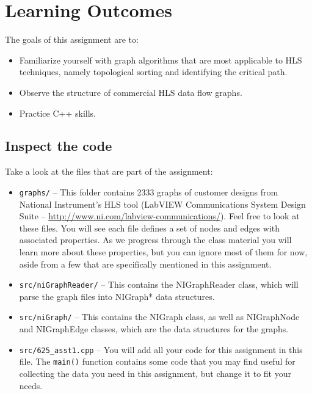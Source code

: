 



\setuppage



\maketitle
\thispagestyle{fancy}

\section{Learning Outcomes}
The goals of this assignment are to:
\begin{itemize}
	\item Familiarize yourself with graph algorithms that are most applicable to HLS techniques, namely topological sorting and identifying the critical path.
	\item Observe the structure of commercial HLS data flow graphs.
	\item Practice C++ skills.
\end{itemize}



\subsection{Inspect the code}
Take a look at the files that are part of the assignment:
\begin{itemize}
	\item {\tt graphs/} -- This folder contains 2333 graphs of customer designs from National Instrument's HLS tool (LabVIEW Communications System Design Suite -- \url{http://www.ni.com/labview-communications/}).  Feel free to look at these files.  You will see each file defines a set of nodes and edges with associated properties.  As we progress through the class material you will learn more about these properties, but you can ignore most of them for now, aside from a few that are specifically mentioned in this assignment.
	\item {\tt src/niGraphReader/} -- This contains the NIGraphReader class, which will parse the graph files into NIGraph* data structures.
	\item {\tt src/niGraph/} -- This contains the NIGraph class, as well as NIGraphNode and NIGraphEdge classes, which are the data structures for the graphs.
	\item {\tt src/625\_asst1.cpp} -- You will add all your code for this assignment in this file.  The {\tt main()} function contains some code that you may find useful for collecting the data you need in this assignment, but change it to fit your needs.
\end{itemize}

